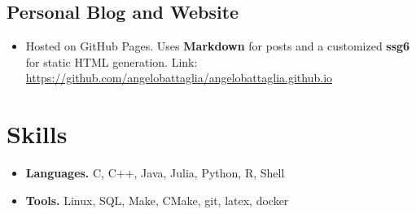 \documentclass[11pt,letter,roman]{moderncv}
\begin{document}
    \subsection{Personal Blog and Website} %
    \begin{itemize}
      \item Hosted on GitHub Pages. Uses {\bf Markdown} for posts and a customized {\bf ssg6} for static HTML generation. Link: \url{ https://github.com/angelobattaglia/angelobattaglia.github.io}
    \end{itemize}

\section{ Skills }
    \begin{itemize}
    \item { \bf Languages. }  C, C++, Java, Julia, Python, R, Shell
    \item { \bf Tools. } Linux, SQL, Make, CMake, git, latex, docker
    \end{itemize}


  
\end{document}
